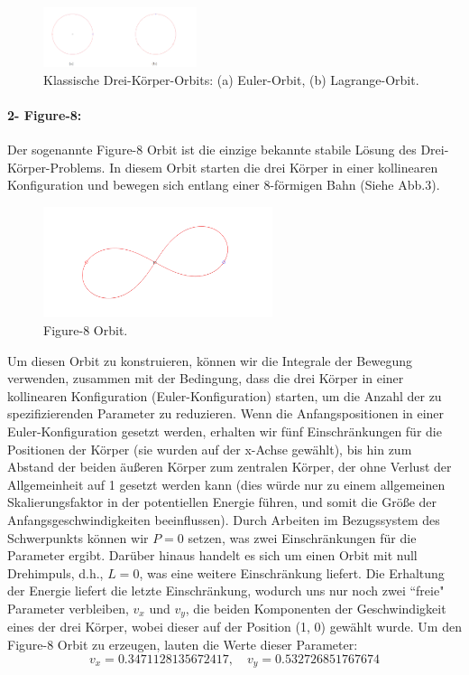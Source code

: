 \documentclass[a4paper,12pt,twoside]{article}
\begin{document}
\begin{figure}[H]
	\centering
	\includegraphics[width=0.4\textwidth]{EulerUndLagrange.png}
	\caption[Eintrag in Abbildungsverzeichnis von Grumpy Cat]{Klassische Drei-Körper-Orbits: (a) Euler-Orbit, (b) Lagrange-Orbit.}
	\label{EulerUndLagrange .}
\end{figure}

\paragraph{2- Figure-8: }
Der sogenannte Figure-8 Orbit ist die einzige bekannte stabile Lösung des Drei-Körper-Problems. In diesem Orbit starten die drei Körper in einer kollinearen Konfiguration und bewegen sich entlang einer 8-förmigen Bahn (Siehe Abb.3).

\begin{figure}[H]
    \centering
    \includegraphics[width=0.6\textwidth]{figure8Orbit.png}
    \caption{Figure-8 Orbit.}
    \label{fig:figure8Orbit}
\end{figure}

Um diesen Orbit zu konstruieren, können wir die Integrale der Bewegung verwenden, 
zusammen mit der Bedingung, dass die drei Körper in einer kollinearen Konfiguration (Euler-Konfiguration) starten, um die Anzahl der zu spezifizierenden Parameter zu reduzieren. 
Wenn die Anfangspositionen in einer Euler-Konfiguration gesetzt werden, erhalten wir fünf Einschränkungen für die Positionen der Körper (sie wurden auf der x-Achse gewählt), bis hin zum Abstand der beiden äußeren Körper zum zentralen Körper, der ohne Verlust der Allgemeinheit auf 1 gesetzt werden kann (dies würde nur zu einem allgemeinen Skalierungsfaktor in der potentiellen Energie führen, und somit die Größe der Anfangsgeschwindigkeiten beeinflussen). 
Durch Arbeiten im Bezugssystem des Schwerpunkts können wir $P = 0$ setzen, was zwei Einschränkungen für die Parameter ergibt. Darüber hinaus handelt es sich um einen Orbit mit null Drehimpuls, d.h., $L = 0$, was eine weitere Einschränkung liefert. Die Erhaltung der Energie liefert die letzte Einschränkung, wodurch uns nur noch zwei ``freie" Parameter verbleiben, $v_x$ und $v_y$, die beiden Komponenten der Geschwindigkeit eines der drei Körper, wobei dieser auf der Position (1, 0) gewählt wurde. Um den Figure-8 Orbit zu erzeugen, lauten die Werte dieser Parameter:
\begin{equation}
	v_x = 0.3471128135672417, \quad v_y = 0.532726851767674
	\label{ref1}
\end{equation}
\end{document}
